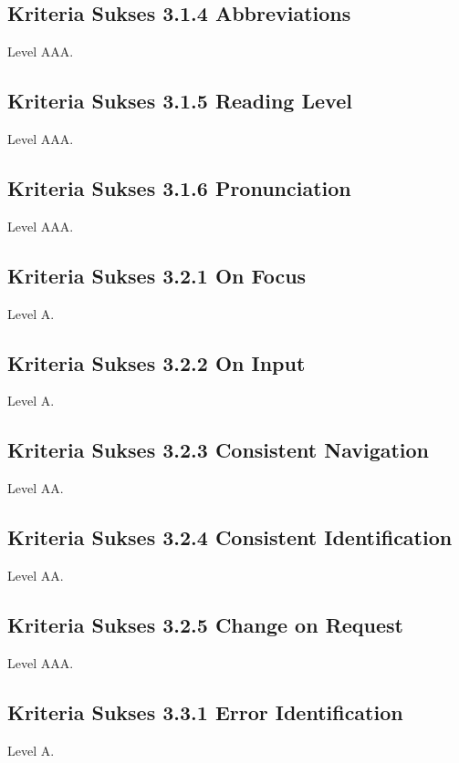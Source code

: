 {\subsection{Kriteria Sukses 3.1.4 Abbreviations}
\label{sec:kriteria_3.1.4}
Level AAA.

\subsection{Kriteria Sukses 3.1.5 Reading Level}
\label{sec:kriteria_3.1.5}
Level AAA.

\subsection{Kriteria Sukses 3.1.6 Pronunciation}
\label{sec:kriteria_3.1.6}
Level AAA.

\subsection{Kriteria Sukses 3.2.1 On Focus}
\label{sec:kriteria_3.2.1}
Level A.

\subsection{Kriteria Sukses 3.2.2 On Input}
\label{sec:kriteria_3.2.2}
Level A.

\subsection{Kriteria Sukses 3.2.3 Consistent Navigation}
\label{sec:kriteria_3.2.3}
Level AA.

\subsection{Kriteria Sukses 3.2.4 Consistent Identification}
\label{sec:kriteria_3.2.4}
Level AA.

\subsection{Kriteria Sukses 3.2.5 Change on Request}
\label{sec:kriteria_3.2.5}
Level AAA.

\subsection{Kriteria Sukses 3.3.1 Error Identification}
\label{sec:kriteria_3.3.1}
Level A.

}
